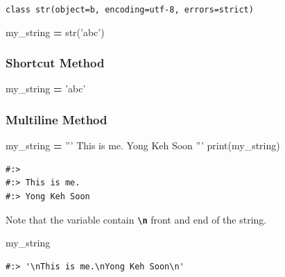 \documentclass[
]{book}
\newenvironment{Shaded}{\begin{snugshade}}{\end{snugshade}}
\newcommand{\BuiltInTok}[1]{#1}
\newcommand{\NormalTok}[1]{#1}
\newcommand{\OperatorTok}[1]{\textcolor[rgb]{0.43,0.43,0.43}{\textbf{#1}}}
\newcommand{\StringTok}[1]{\textcolor[rgb]{0.5,0.5,0.5}{#1}}
\begin{document}
\texttt{class\ str(object=b\textquotesingle{}\textquotesingle{},\ encoding=\textquotesingle{}utf-8\textquotesingle{},\ errors=\textquotesingle{}strict\textquotesingle{})}

\begin{Shaded}
\begin{Highlighting}[]
\NormalTok{my_string }\OperatorTok{=} \BuiltInTok{str}\NormalTok{(}\StringTok{'abc'}\NormalTok{)}
\end{Highlighting}
\end{Shaded}

\hypertarget{shortcut-method}{%
\subsubsection{Shortcut Method}\label{shortcut-method}}

\begin{Shaded}
\begin{Highlighting}[]
\NormalTok{my_string }\OperatorTok{=} \StringTok{'abc'}
\end{Highlighting}
\end{Shaded}

\hypertarget{multiline-method}{%
\subsubsection{Multiline Method}\label{multiline-method}}

\begin{Shaded}
\begin{Highlighting}[]
\NormalTok{my_string }\OperatorTok{=} \StringTok{'''}
\StringTok{This is me.}
\StringTok{Yong Keh Soon}
\StringTok{'''}
\BuiltInTok{print}\NormalTok{(my_string)}
\end{Highlighting}
\end{Shaded}

\begin{verbatim}
#:> 
#:> This is me.
#:> Yong Keh Soon
\end{verbatim}

Note that the variable contain \textbf{\texttt{\textbackslash{}n}} front and end of the string.

\begin{Shaded}
\begin{Highlighting}[]
\NormalTok{my_string}
\end{Highlighting}
\end{Shaded}

\begin{verbatim}
#:> '\nThis is me.\nYong Keh Soon\n'
\end{verbatim}
\end{document}
